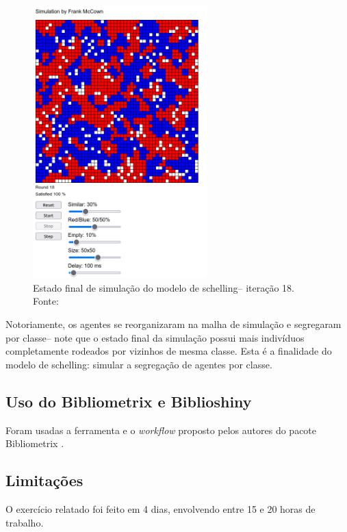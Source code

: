 \begin{figure}
    \centering
    \includegraphics[width=0.6\textwidth]{exploratory-data-analysis/bananaMoshpit/PesqBibliogr/SimulacaoMultiagente/schelling-FM-final.png}
    \caption{Estado final de simulação do modelo de schelling-- iteração 18. Fonte: \citet{mccown_schellings_nodate}}
    \label{STL@bananaMoshpit-schelling-final}
\end{figure}

Notoriamente, os agentes se reorganizaram na malha de simulação e segregaram por classe-- note que o estado final da simulação possui mais indivíduos completamente rodeados por vizinhos de mesma classe. Esta é a finalidade do modelo de schelling: simular a segregação de agentes por classe. 


\subsection{Uso do Bibliometrix e Biblioshiny}

Foram usadas a ferramenta e o \textit{workflow} proposto pelos autores do pacote Bibliometrix \cite{aria_bibliometrix_2017}.

\subsection{Limitações} O exercício relatado foi feito em 4 dias, envolvendo entre 15 e 20 horas de trabalho.


